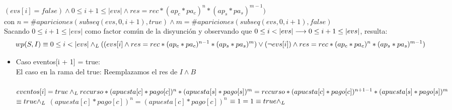 \documentclass[10pt,a4paper]{article}
\begin{document}
\begin{proof*}
	$(evs[i] = false) \wedge 0\leq i+1 \leq |evs| \wedge res = rec *(ap_c * pa_c)^{n} * (ap_s * pa_s)^{m - 1})$\\
	con $n = \#apariciones(subseq(evs, 0, i+1), true) \wedge m = \#apariciones(subseq(evs, 0, i+1), false)$\\
	Sacando $0 \leq i+1 \leq |evs|$ como factor común de la disyunción y observando que $0 \leq i < |evs| \longrightarrow 0 \leq i + 1 \leq |evs|$, resulta:
	\begin{equation*}
		wp(S, I) \equiv 0 \leq i < |evs|  \land _L ((evs[i] \wedge res = rec *(ap_c * pa_c)^{n - 1} * (ap_s * pa_s)^m) \vee 
		(\neg evs[i]) \wedge res = rec *(ap_c * pa_c)^n * (ap_s * pa_s)^{m - 1})
	\end{equation*}
    \begin{minipage}[t]{19cm}
        \begin{itemize}
            \item{Caso eventos[i + 1] = true: \\
            El caso en la rama del true: Reemplazamos el res de $I \land B$
            \hspace{0.1cm}
            \\  \\  \newline
            \hspace{0.8cm}
            $eventos[i] = true \land _L recurso*(apuesta[c]*pago[c]) ^{n} * (apuesta[s]*pago[s]) ^{m} = recurso * (apuesta[c]*pago[c])^{n + 1 - 1} * (apuesta[s]*pago[s])^{m}$ $\equiv true \land _L$ $(apuesta[c]*pago[c])^{n} = (apuesta[c]*pago[c])^{n}$ $\equiv 1 = 1 \equiv true \land _L$ }
        \end{itemize}
    \end{minipage}
    

\end{proof*}
\end{document}

